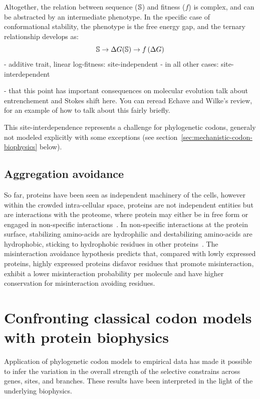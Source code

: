 Altogether, the relation between sequence ($\mathbb{S}$) and fitness ($f$) is complex, and can be abstracted by an intermediate phenotype.
In the specific case of conformational stability, the phenotype is the free energy gap, and the ternary relationship develops as:
\begin{equation}
    \mathbb{S} \rightarrow \Delta G (\mathbb{S}) \rightarrow f \left( \Delta G \right)
\end{equation}
- additive trait, linear log-fitness: site-independent
- in all other cases: site-interdependent

- that this point has important consequences on molecular evolution
talk about entrenchement and Stokes shift here.
You can reread Echave and Wilke's review, for an example of how to talk about this fairly briefly.

This site-interdependence represents a challenge for phylogenetic codons, generaly not modeled explicitly with some exceptions (see section~\ref{sec:mechanistic-codon-biophysics} below).

\subsection{Aggregation avoidance}

So far, proteins have been seen as independent machinery of the cells, however within the crowded intra-cellular space, proteins are not independent entities but are interactions with the proteome, where protein may either be in free form or engaged in non-specific interactions~\citep{Yang2012, Zhang2013}.
In non-specific interactions at the protein surface, stabilizing amino-acids are hydrophilic and destabilizing amino-acids are hydrophobic, sticking to hydrophobic residues in other proteins~\citep{Dixit2013,Manhart2015}.
The misinteraction avoidance hypothesis predicts that, compared with lowly expressed proteins, highly expressed proteins disfavor residues that promote misinteraction, exhibit a lower misinteraction probability per molecule and have higher conservation for misinteraction avoiding residues.


\section{Confronting classical codon models with protein biophysics}
\label{sec:classical-codon-biophysics}

Application of phylogenetic codon models to empirical data has made it possible to infer the variation in the overall strength of the selective constrains across genes, sites, and branches.
These results have been interpreted in the light of the underlying biophysics.

